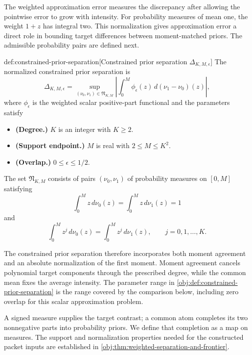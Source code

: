 The weighted approximation error  measures the discrepancy after allowing the pointwise error to grow with intensity. For probability measures of mean one, the weight \(1+z\) has integral two. This normalization gives approximation error a direct role in bounding target differences between moment-matched priors. The admissible probability pairs are defined next.

\begin{definitionv}{def:constrained-prior-separation}[Constrained prior separation \(\Delta_{K,M,\epsilon}\)]
The normalized constrained prior separation is
\[
\Delta_{K,M,\epsilon}
=
\sup_{(\nu_0,\nu_1)\in\mathfrak N_{K,M}}
\left|
\int_0^M\phi_\epsilon(z)\,d(\nu_1-\nu_0)(z)
\right|,
\]
where \(\phi_\epsilon\) is the weighted scalar positive-part functional and the parameters satisfy
\begin{itemize}
\item \textbf{(Degree.)} \(K\) is an integer with \(K\geq2\).
\item \textbf{(Support endpoint.)} \(M\) is real with \(2\leq M\leq K^2\).
\item \textbf{(Overlap.)} \(0\leq\epsilon\leq1/2\).
\end{itemize}
The set \(\mathfrak N_{K,M}\) consists of pairs \((\nu_0,\nu_1)\) of probability measures on \([0,M]\) satisfying
\[
\int_0^M z\,d\nu_0(z)
=
\int_0^M z\,d\nu_1(z)
=1
\]
and
\[
\int_0^M z^j\,d\nu_0(z)
=
\int_0^M z^j\,d\nu_1(z),
\qquad j=0,1,\ldots,K.
\]
\end{definitionv}

The constrained prior separation  therefore incorporates both moment agreement and an absolute normalization of the first moment. Moment agreement cancels polynomial target components through the prescribed degree, while the common mean fixes the average intensity. The parameter range in \cref{obj:def:constrained-prior-separation} is the range covered by the comparison below, including zero overlap for this scalar approximation problem.

A signed measure supplies the target contrast; a common atom completes its two nonnegative parts into probability priors. We define that completion as a map on measures. The support and normalization properties needed for the constructed packet inputs are established in \cref{obj:thm:weighted-separation-and-frontier}.

